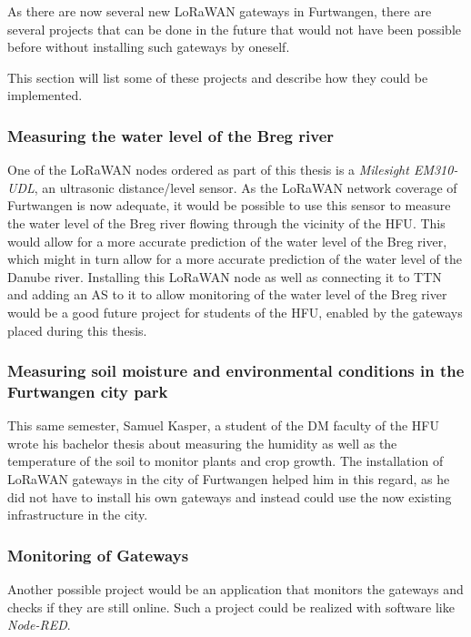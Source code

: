 As there are now several new \ac{LoRaWAN} gateways in Furtwangen, there are several projects that can be done in the future that would not have been possible before without installing such gateways by oneself.

This section will list some of these projects and describe how they could be implemented.

\subsubsection{Measuring the water level of the Breg river}

One of the \ac{LoRaWAN} nodes ordered as part of this thesis is a \emph{Milesight EM310-UDL}, an ultrasonic distance/level sensor.
As the \ac{LoRaWAN} network coverage of Furtwangen is now adequate, it would be possible to use this sensor to measure the water level of the Breg river flowing through the vicinity of the \ac{HFU}.
This would allow for a more accurate prediction of the water level of the Breg river, which might in turn allow for a more accurate prediction of the water level of the Danube river.
Installing this \ac{LoRaWAN} node as well as connecting it to \ac{TTN} and adding an \acf{AS} to it to allow monitoring of the water level of the Breg river would be a good future project for students of the \ac{HFU}, enabled by the gateways placed during this thesis.

\subsubsection{Measuring soil moisture and environmental conditions in the Furtwangen city park}

This same semester, Samuel Kasper, a student of the \ac{DM} faculty of the \ac{HFU} wrote his bachelor thesis about measuring the humidity as well as the temperature of the soil to monitor plants and crop growth.
The installation of \ac{LoRaWAN} gateways in the city of Furtwangen helped him in this regard, as he did not have to install his own gateways and instead could use the now existing infrastructure in the city.

\subsubsection{Monitoring of Gateways}

Another possible project would be an application that monitors the gateways and checks if they are still online.
Such a project could be realized with software like \emph{Node-RED}.

